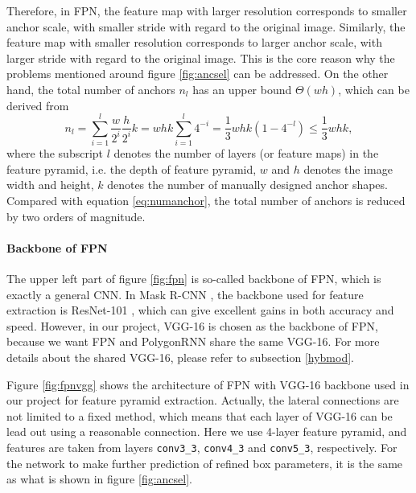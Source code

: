 

Therefore, in FPN, the feature map with larger resolution corresponds to smaller anchor scale, with smaller stride with regard to the original image. Similarly, the feature map with smaller resolution corresponds to larger anchor scale, with larger stride with regard to the original image. This is the core reason why the problems mentioned around figure \ref{fig:ancsel} can be addressed. On the other hand, the total number of anchors $n_l$ has an upper bound $\Theta(wh)$, which can be derived from
\begin{equation}
	n_l = \sum_{i=1}^{l}\frac{w}{2^i}\frac{h}{2^i}k=whk\sum_{i=1}^{l}4^{-i}=\frac{1}{3}whk(1-4^{-l}) \leqslant \frac{1}{3}whk,
\end{equation}
where the subscript $l$ denotes the number of layers (or feature maps) in the feature pyramid, i.e. the depth of feature pyramid, $w$ and $h$ denotes the image width and height, $k$ denotes the number of manually designed anchor shapes. Compared with equation \ref{eq:numanchor}, the total number of anchors is reduced by two orders of magnitude.

\paragraph{Backbone of FPN}
The upper left part of figure \ref{fig:fpn} is so-called backbone of FPN, which is exactly a general CNN. In Mask R-CNN \cite{maskrcnn}, the backbone used for feature extraction is ResNet-101 \cite{resnet}, which can give excellent gains in both accuracy and speed. However, in our project, VGG-16 \cite{vgg16} is chosen as the backbone of FPN, because we want FPN and PolygonRNN share the same VGG-16. For more details about the shared VGG-16, please refer to subsection \ref{hybmod}.

Figure \ref{fig:fpnvgg} shows the architecture of FPN with VGG-16 backbone used in our project for feature pyramid extraction. Actually, the lateral connections are not limited to a fixed method, which means that each layer of VGG-16 can be lead out using a reasonable connection. Here we use 4-layer feature pyramid, and features are taken from layers \lstinline{conv3_3}, \lstinline{conv4_3} and \lstinline{conv5_3}, respectively. For the network to make further prediction of refined box parameters, it is the same as what is shown in figure \ref{fig:ancsel}.



\section{\modelnameshort}\label{modmer}

